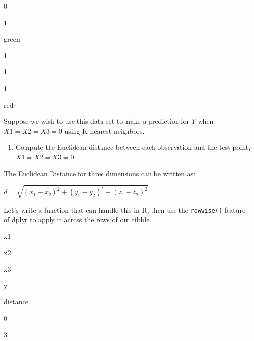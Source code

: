 \documentclass[]{book}
\newenvironment{Shaded}{\begin{snugshade}}{\end{snugshade}}
\newcommand{\ControlFlowTok}[1]{\textcolor[rgb]{0.13,0.29,0.53}{\textbf{#1}}}
\newcommand{\DataTypeTok}[1]{\textcolor[rgb]{0.13,0.29,0.53}{#1}}
\newcommand{\DecValTok}[1]{\textcolor[rgb]{0.00,0.00,0.81}{#1}}
\newcommand{\KeywordTok}[1]{\textcolor[rgb]{0.13,0.29,0.53}{\textbf{#1}}}
\newcommand{\NormalTok}[1]{#1}
\newcommand{\OperatorTok}[1]{\textcolor[rgb]{0.81,0.36,0.00}{\textbf{#1}}}
\newcommand{\StringTok}[1]{\textcolor[rgb]{0.31,0.60,0.02}{#1}}
\providecommand{\tightlist}{%
  \setlength{\itemsep}{0pt}\setlength{\parskip}{0pt}}
\begin{document}
0

1

green

1

1

1

red

Suppose we wish to use this data set to make a prediction for \(Y\) when \(X1 = X2 = X3 = 0\) using K-nearest neighbors.

\begin{enumerate}
\def\labelenumi{(\alph{enumi})}
\tightlist
\item
  Compute the Euclidean distance between each observation and the test point, \(X1 = X2 = X3 = 0\).
\end{enumerate}

The Euclidean Distance for three dimensions can be written as:

\(d = \sqrt {\left( {x_1 - x_2 } \right)^2 + \left( {y_1 - y_2 } \right)^2 + \left( {z_1 - z_2 } \right)^2 }\)

Let's write a function that can handle this in R, then use the \texttt{rowwise()} feature of dplyr to apply it across the rows of our tibble.

\begin{Shaded}
\end{Shaded}

x1

x2

x3

y

distance

0

3
\end{document}
